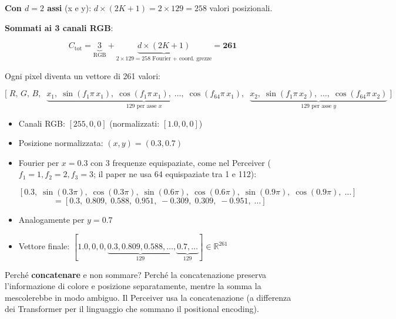 \documentclass[
  11pt,
]{article}
\begin{document}
\begin{formulabox}[title={\textbf{Calcolo di $C$: perché 261 e non 3}}]
\textbf{Con $d=2$ assi} (x e y): $d \times (2K+1) = 2 \times 129 = 258$ valori posizionali.

\textbf{Sommati ai 3 canali RGB}:

\[
C_{\text{tot}} = \underbrace{3}_{\text{RGB}} + \underbrace{d \times (2K + 1)}_{2 \times 129 = 258 \text{ Fourier + coord. grezze}} = \mathbf{261}
\]

Ogni pixel diventa un vettore di 261 valori:

\[
\Big[\; R,\, G,\, B,\;\; \underbrace{x_1,\; \sin(f_1 \pi\, x_1),\; \cos(f_1 \pi\, x_1),\; \ldots,\; \cos(f_{64} \pi\, x_1)}_{129 \text{ per asse } x},\;\; \underbrace{x_2,\; \sin(f_1 \pi\, x_2),\; \ldots,\; \cos(f_{64} \pi\, x_2)}_{129 \text{ per asse } y} \;\Big]
\]
\end{formulabox}

\begin{notabox}[title={\textbf{Esempio concreto: un pixel in posizione $(0.3, 0.7)$ con colore rosso}}]
\begin{itemize}
\item Canali RGB: $[255, 0, 0]$ (normalizzati: $[1.0, 0, 0]$)
\item Posizione normalizzata: $(x, y) = (0.3, 0.7)$
\item Fourier per $x=0.3$ con 3 frequenze equispaziate, come nel Perceiver ($f_1=1, f_2=2, f_3=3$; il paper ne usa 64 equispaziate tra 1 e 112):

\[
[0.3,\; \sin(0.3\pi),\; \cos(0.3\pi),\; \sin(0.6\pi),\; \cos(0.6\pi),\; \sin(0.9\pi),\; \cos(0.9\pi),\; \ldots]
\]
\[
= [0.3,\; 0.809,\; 0.588,\; 0.951,\; -0.309,\; 0.309,\; -0.951,\; \ldots]
\]
\item Analogamente per $y=0.7$
\item Vettore finale: $[1.0, 0, 0, \underbrace{0.3, 0.809, 0.588, \ldots}_{129}, \underbrace{0.7, \ldots}_{129}] \in \mathbb{R}^{261}$
\end{itemize}
Perché \textbf{concatenare} e non sommare? Perché la concatenazione preserva l'informazione di colore e posizione separatamente, mentre la somma la mescolerebbe in modo ambiguo. Il Perceiver usa la concatenazione (a differenza dei Transformer per il linguaggio che sommano il positional encoding).
\end{notabox}
\end{document}
